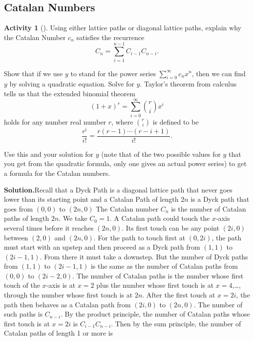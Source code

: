 \documentclass[10pt,]{book}
\theoremstyle{plain}
\theoremstyle{definition}
\newtheorem{activity}[project]{Activity}
\numberwithin{equation}{chapter}
\begin{document}
\subsection[{Catalan Numbers}]{Catalan Numbers}\label{subsection-50}
\begin{activity}[]\label{CatalanRecurrence}
Using either lattice paths or diagonal lattice paths, explain why the Catalan Number \(c_n\) satisfies the recurrence%
\begin{equation*}
C_n = \sum_{i=1}^{n-1} C_{i-1}C_{n-i}.
\end{equation*}
%
\par
Show that if we use \(y\) to stand for the power series \(\sum_{i=0}^\infty c_nx^n\), then we can find \(y\) by solving a quadratic equation. Solve for \(y\). Taylor's theorem from calculus tells us that the extended binomial theorem%
\begin{equation*}
(1+x)^r = \sum_{i=0}^\infty \binom{r}{i}x^i
\end{equation*}
holds for any number real number \(r\), where \(\binom{r}{i}\) is defined to be%
\begin{equation*}
\frac{r^{\underline{i}}}{i!} = \frac{r(r-1)\cdots(r-i+1)}{i!}.
\end{equation*}
%
\par
Use this and your solution for \(y\) (note that of the two possible values for \(y\) that you get from the quadratic formula, only one gives an actual power series) to get a formula for the Catalan numbers.%
\par\medskip\noindent%
\textbf{Solution.}\quad Recall that a Dyck Path is a diagonal lattice path that never goes lower than its starting point and a Catalan Path of length \(2n\) is a Dyck path that goes from \((0,0)\) to \((2n,0)\) The Catalan number \(C_n\) is the number of Catalan paths of length \(2n\). We take \(C_0=1\). A Catalan path could touch the \(x\)-axis several times before it reaches \((2n,0)\). Its first touch can be any point \((2i,0)\) between \((2,0)\) and \((2n,0)\). For the path to touch first at \((0,2i)\), the path must start with an upstep and then proceed as a Dyck path from \((1,1)\) to \((2i-1,1)\). From there it must take a downstep. But the number of Dyck paths from \((1,1)\) to \((2i-1,1)\) is the same as the number of Catalan paths from \((0,0)\) to \((2i-2,0)\). The number of Catalan paths is the number whose first touch of the \(x\)-axis is at \(x=2\) plus the number whose first touch is at \(x=4\),\dots{}, through the number whose first touch is at \(2n\). After the first touch at \(x=2i\), the path then behaves as a Catalan path from \((2i,0)\) to \((2n,0)\). The number of such paths is \(C_{n-i}\). By the product principle, the number of Catalan paths whose first touch is at \(x=2i\) is \(C_{i-1}C_{n-i}\). Then by the sum principle, the number of Catalan paths of length 1 or more is%

\end{activity}
\end{document}
